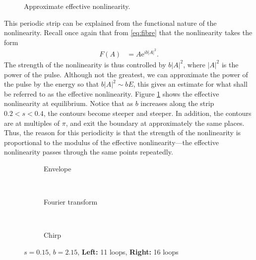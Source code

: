 %
\begin{figure}[tbp]
\centering

\caption{Approximate effective nonlinearity.}
\label{fig:effnl}
\end{figure}
This periodic strip can be explained from the functional nature of the nonlinearity. Recall once again that from \eqref{eq:fibre} that the nonlinearity takes the form
\begin{align*}
F(A) &= A \textrm{e}^{i b |A|^2}.
\end{align*}
The strength of the nonlinearity is thus controlled by $b |A|^2$, where $|A|^2$ is the power of the pulse. Although not the greatest, we can approximate the power of the pulse by the energy so that $b |A|^2 \sim b E$, this gives an estimate for what shall be referred to as the effective nonlinearity. Figure \ref{fig:effnl} shows the effective nonlinearity at equilibrium. Notice that as $b$ increases along the strip $0.2 < s < 0.4$, the contours become steeper and steeper. In addition, the contours are at multiples of $\pi$, and exit the boundary at approximately the same places. Thus, the reason for this periodicity is that the strength of the nonlinearity is proportional to the modulus of the effective nonlinearity---the effective nonlinearity passes through the same points repeatedly. \\

\begin{figure}[p]
\centering
\begin{subfigure}{\textwidth}
\centering
%

\caption{Envelope}
\end{subfigure} \\
\begin{subfigure}{\textwidth}
\centering
%

\caption{Fourier transform}
\end{subfigure} \\
\begin{subfigure}{\textwidth}
\centering
%

\caption{Chirp}
\end{subfigure}
\caption{$s = 0.15$, $b = 2.15$, \textbf{Left:} 11 loops, \textbf{Right:} 16 loops}
\label{fig:break}
\end{figure}

